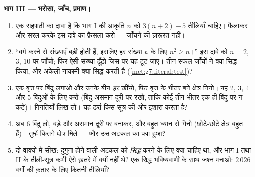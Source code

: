 \begin{problem}
\medskip
\noindent\textbf{भाग III --- भरोसा, जाँच, प्रमाण।}
\begin{enumerate}[resume]
  \item एक सहपाठी का दावा है कि भाग I की आकृति $n$ को
        $3(n + 2) - 5$ तीलियाँ चाहिए। फैलाकर और सरल करके इस दावे
        का फ़ैसला करो --- जाँचने की ज़रूरत नहीं।
  \item ``वर्ग करने से संख्याएँ बड़ी होती हैं, इसलिए हर संख्या
        $n$ के लिए $n^2 \geq n$।'' इस दावे को $n = 2$, $3$, $10$
        पर जाँचो; फिर ऐसी संख्या ढूँढ़ो जिस पर यह टूट जाए। तीन
        सफल जाँचों ने क्या सिद्ध किया, और अकेली नाकामी क्या
        सिद्ध करती है (\cref{met:g7:literal:test})?
  \item एक वृत्त पर बिंदु लगाओ और उनके बीच \emph{हर} 
        खींचो, फिर वृत्त के भीतर बने क्षेत्र गिनो। यह $2$, $3$,
        $4$ और $5$ बिंदुओं के लिए करो (बिंदु असमान दूरी पर रखो,
        ताकि कोई तीन  भीतर एक ही बिंदु पर न कटें)।
        गिनतियाँ लिख लो। यह ढर्रा किस सूत्र की ओर इशारा करता है?
  \item अब $6$ बिंदु लो, बड़े और असमान दूरी पर बनाकर, और बहुत
        ध्यान से गिनो (छोटे-छोटे क्षेत्र बहुत हैं)। तुम्हें कितने
        क्षेत्र मिले --- और उस अटकल का क्या हुआ?
  \item दो वाक्यों में सीख: दुगुना होने वाली अटकल को \emph{सिद्ध}
        करने के लिए क्या चाहिए था, और भाग I तथा II के तीली-सूत्र
        कभी ऐसे ख़तरे में क्यों नहीं थे? एक सिद्ध भविष्यवाणी के
        साथ जश्न मनाओ: $2\,026$ वर्गों की क़तार के लिए कितनी
        तीलियाँ?
\end{enumerate}
\end{problem}
